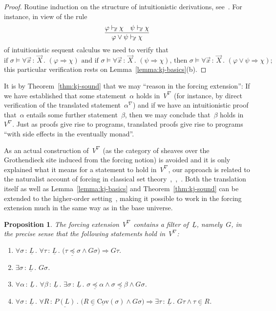\documentclass[com,11pt,crcready]{iosart2x}
\theoremstyle{definition}
\theoremstyle{plain}
\newtheorem{proposition}[definition]{Proposition}
\theoremstyle{remark}
\newcommand{\?}{\,{:}\,}
\newcommand{\seq}[1]{\mathrel{\vdash\!\!\!_{#1}}}
\newcommand{\Cov}{\mathrm{Cov}}
\newcommand{\forces}{\vDash}
\renewcommand{\_}{\mathpunct{.}\,}
\begin{document}
\begin{proof}Routine induction on the structure of intuitionistic derivations,
see~\cite[Sections~6.7,~6.8]{borceux:handbook3}. For instance, in view of the
rule
\[
  \infer{\varphi \vee \psi \seq{\vec x} \chi}{\varphi \seq{\vec x} \chi \quad
  \psi \seq{\vec x} \chi}
\]
of intuitionistic sequent calculus we need to verify that
\[
  \text{if
  $\sigma \forces \forall \vec x\?\vec X\_ (\varphi \Rightarrow \chi)$ and if
  $\sigma \forces \forall \vec x\?\vec X\_ (\psi \Rightarrow \chi)$, then
  $\sigma \forces \forall \vec x\?\vec X\_ (\varphi \vee \psi \Rightarrow \chi)$;
  }
\]
this particular verification rests on Lemma~\ref{lemma:kj-basics}(b).
\end{proof}

It is by Theorem~\ref{thm:kj-sound} that we may ``reason in the forcing
extension'': If we have established that some statement~$\alpha$ holds
in~$V^\nabla$ (for instance, by direct verification of the translated
statement~$\alpha^\nabla$) and if we have an intuitionistic proof that~$\alpha$
entails some further statement~$\beta$, then we may conclude that~$\beta$ holds
in~$V^\nabla$. Just as proofs give rise to programs, translated proofs give
rise to programs ``with side effects in the eventually monad''.

As an actual construction of~$V^\nabla$ (as the category of sheaves over the
Grothendieck site induced from the forcing notion) is avoided and it is only
explained what it means for a statement to hold in~$V^\nabla$, our approach is
related to the naturalist account of forcing in classical set
theory~\cite[Theorem~2]{hamkins:multiverse},~\cite[Section~4]{maddy-meadows:reconstruction},~\cite{barton:forcing}.
Both the translation itself as well as Lemma~\ref{lemma:kj-basics} and
Theorem~\ref{thm:kj-sound} can be extended to the higher-order
setting~\cite[Section~D4.1]{johnstone:elephant}, making it possible to work in the forcing extension much in
the same way as in the base universe.

\begin{proposition}The forcing extension~$V^\nabla$ contains a filter
of~$\underline{L}$, namely~$G$, in the precise sense that the following
statements hold in~$V^\nabla$:
\begin{enumerate}
\item[(1)] $\forall \sigma \? \underline{L}\_ \forall \tau \? \underline{L}\_
\bigl(\tau \mathrel{\underline{\preceq}} \sigma \wedge G\sigma\bigr)
\Rightarrow G\tau$.
\item[(2a)] $\exists \sigma \? \underline{L}\_ G\sigma$.
\item[(2b)] $\forall \alpha \? \underline{L}\_
\forall \beta \? \underline{L}\_
\exists \sigma \? \underline{L}\_
\sigma \mathrel{\underline{\preceq}} \alpha \wedge
\sigma \mathrel{\underline{\preceq}} \beta \wedge
G\sigma$.
\item[(3)] $\forall \sigma \? \underline{L}\_
\forall R \? \underline{P(L)}\_
\bigl(R \mathrel{\underline{\in}} \underline{\Cov}(\sigma) \wedge
G\sigma\bigr) \Rightarrow
\exists \tau \? \underline{L}\_
G\tau \wedge \tau \mathrel{\underline{\in}} R$.
\end{enumerate}
\end{proposition}
\end{document}
